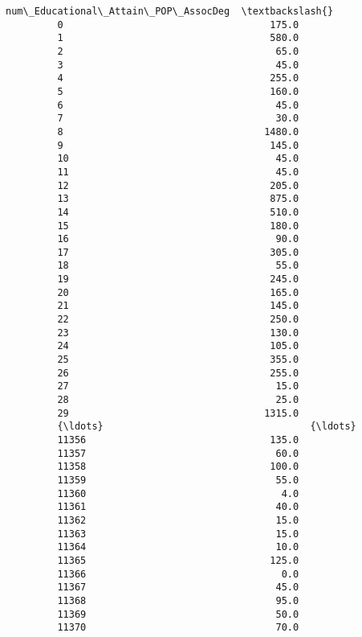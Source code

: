 \documentclass[11pt]{article}
\begin{document}
\begin{Verbatim}[commandchars=\\\{\}]
                num\_Educational\_Attain\_POP\_AssocDeg  \textbackslash{}
         0                                    175.0   
         1                                    580.0   
         2                                     65.0   
         3                                     45.0   
         4                                    255.0   
         5                                    160.0   
         6                                     45.0   
         7                                     30.0   
         8                                   1480.0   
         9                                    145.0   
         10                                    45.0   
         11                                    45.0   
         12                                   205.0   
         13                                   875.0   
         14                                   510.0   
         15                                   180.0   
         16                                    90.0   
         17                                   305.0   
         18                                    55.0   
         19                                   245.0   
         20                                   165.0   
         21                                   145.0   
         22                                   250.0   
         23                                   130.0   
         24                                   105.0   
         25                                   355.0   
         26                                   255.0   
         27                                    15.0   
         28                                    25.0   
         29                                  1315.0   
         {\ldots}                                    {\ldots}   
         11356                                135.0   
         11357                                 60.0   
         11358                                100.0   
         11359                                 55.0   
         11360                                  4.0   
         11361                                 40.0   
         11362                                 15.0   
         11363                                 15.0   
         11364                                 10.0   
         11365                                125.0   
         11366                                  0.0   
         11367                                 45.0   
         11368                                 95.0   
         11369                                 50.0   
         11370                                 70.0   

\end{Verbatim}
\end{document}
